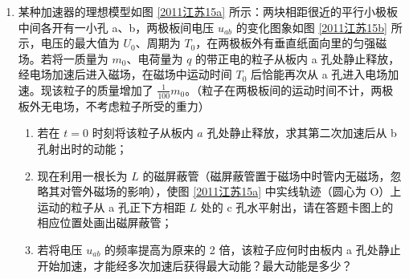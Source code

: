 \documentclass[\gkver]{gaokaozhenti}
\begin{document}
\begin{enumerate}


\item
某种加速器的理想模型如图 \ref{2011江苏15a} 所示：两块相距很近的平行小极板中间各开有一小孔 a、b，两极板间电压 $u_{ab}$ 的变化图象如图 \ref{2011江苏15b} 所示，电压的最大值为 $U_{0}$、周期为 $T_{0}$，在两极板外有垂直纸面向里的匀强磁场。若将一质量为 $m_{0}$、电荷量为 $q$ 的带正电的粒子从板内 a 孔处静止释放，经电场加速后进入磁场，在磁场中运动时间 $T_{0}$ 后恰能再次从 a 孔进入电场加速。现该粒子的质量增加了 $\frac{1}{100}m_{0}$。（粒子在两极板间的运动时间不计，两极板外无电场，不考虑粒子所受的重力）

\begin{enumerate}
	\item
	若在 $t=0$ 时刻将该粒子从板内 $a$ 孔处静止释放，求其第二次加速后从 b 孔射出时的动能；
	\item
	现在利用一根长为 $L$ 的磁屏蔽管（磁屏蔽管置于磁场中时管内无磁场，忽略其对管外磁场的影响），使图 \ref{2011江苏15a} 中实线轨迹（圆心为 O）上运动的粒子从 a 孔正下方相距 $L$ 处的 c 孔水平射出，请在答题卡图上的相应位置处画出磁屏蔽管；
	\item
	若将电压 $u_{ab}$ 的频率提高为原来的 2 倍，该粒子应何时由板内 a 孔处静止开始加速，才能经多次加速后获得最大动能？最大动能是多少？
\end{enumerate}


\end{enumerate}
\end{document}
